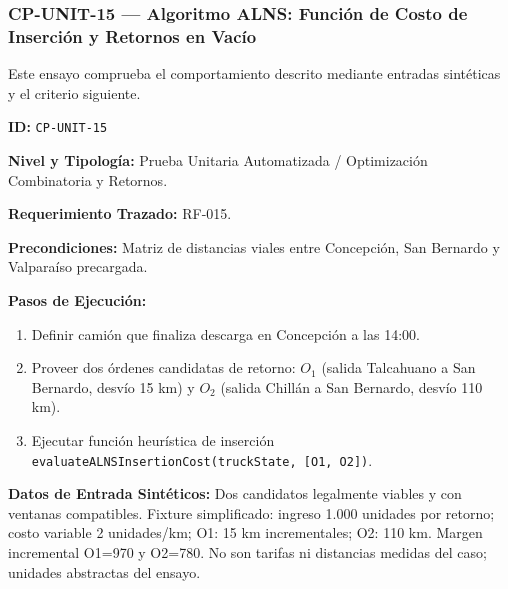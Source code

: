 \subsubsection*{CP-UNIT-15 — Algoritmo ALNS: Función de Costo de Inserción y Retornos en Vacío}\label{sec:9-cp-unit-15}
Este ensayo comprueba el comportamiento descrito mediante entradas sintéticas y el criterio siguiente.

\par\noindent\textbf{ID:} \texttt{C\allowbreak{}P\allowbreak{}-\allowbreak{}U\allowbreak{}N\allowbreak{}I\allowbreak{}T\allowbreak{}-\allowbreak{}1\allowbreak{}5\allowbreak{}}\par
\par\noindent\textbf{Nivel y Tipología:} Prueba Unitaria Automatizada / Optimización Combinatoria y Retornos.\par
\par\noindent\textbf{Requerimiento Trazado:} RF-015.\par
\par\noindent\textbf{Precondiciones:} Matriz de distancias viales entre Concepción, San Bernardo y Valparaíso precargada.\par
\par\noindent\textbf{Pasos de Ejecución:} \par
\begin{enumerate}
\item Definir camión que finaliza descarga en Concepción a las 14:00.
\item Proveer dos órdenes candidatas de retorno: \(O_1\) (salida Talcahuano a San Bernardo, desvío 15 km) y \(O_2\) (salida Chillán a San Bernardo, desvío 110 km).
\item Ejecutar función heurística de inserción \texttt{e\allowbreak{}v\allowbreak{}a\allowbreak{}l\allowbreak{}u\allowbreak{}a\allowbreak{}t\allowbreak{}e\allowbreak{}A\allowbreak{}L\allowbreak{}N\allowbreak{}S\allowbreak{}I\allowbreak{}n\allowbreak{}s\allowbreak{}e\allowbreak{}r\allowbreak{}t\allowbreak{}i\allowbreak{}o\allowbreak{}n\allowbreak{}C\allowbreak{}o\allowbreak{}s\allowbreak{}t\allowbreak{}(\allowbreak{}t\allowbreak{}r\allowbreak{}u\allowbreak{}c\allowbreak{}k\allowbreak{}S\allowbreak{}t\allowbreak{}a\allowbreak{}t\allowbreak{}e\allowbreak{},\allowbreak{} [\allowbreak{}O\allowbreak{}1\allowbreak{},\allowbreak{} O\allowbreak{}2\allowbreak{}]\allowbreak{})\allowbreak{}}.
\end{enumerate}
\par\noindent\textbf{Datos de Entrada Sintéticos:} Dos candidatos legalmente viables y con ventanas compatibles. Fixture simplificado: ingreso 1.000 unidades por retorno; costo variable 2 unidades/km; O1: 15 km incrementales; O2: 110 km. Margen incremental O1=970 y O2=780. No son tarifas ni distancias medidas del caso; unidades abstractas del ensayo.\par
